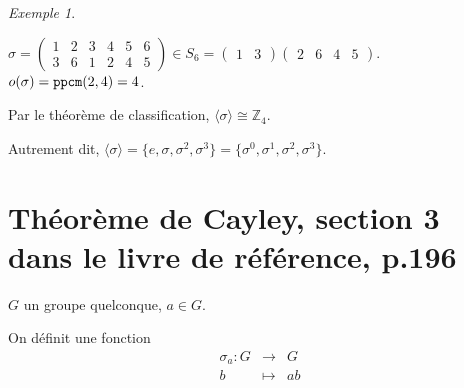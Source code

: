 \documentclass{report}
\newcommand*{\entiers}{\mathbb{Z}}
\theoremstyle{definition}
\theoremstyle{remark}
\newtheorem*{exem}{Exemple}
\begin{document}
	\begin{exem}~

		$\sigma = \begin{pmatrix}
			1&2&3&4&5&6\\
			3&6&1&2&4&5
		\end{pmatrix} \in S_6 = \begin{pmatrix}
			1&3
		\end{pmatrix}\begin{pmatrix}
			2&6&4&5
		\end{pmatrix}$. $o(\sigma) = \verb|ppcm|(2,4) = 4$.

		Par le th\'eor\`eme de classification, $\langle \sigma \rangle \cong \entiers_4$.

		Autrement dit, $\langle \sigma \rangle = \{e, \sigma, \sigma^2, \sigma^3\} = \{\sigma^0, \sigma^1, \sigma^2, \sigma^3\}$.
	\end{exem}

	\section[Th\'eor\`eme de Cayley]{Th\'eor\`eme de Cayley, section 3 dans le livre de r\'ef\'erence, p.196}
	$G$ un groupe quelconque, $a \in G$.

	On d\'efinit une fonction
	\begin{equation*}
		\begin{array}{rcl}
			\sigma_a:G&\to&G\\
			b&\mapsto&ab
		\end{array}
	\end{equation*}
\end{document}
